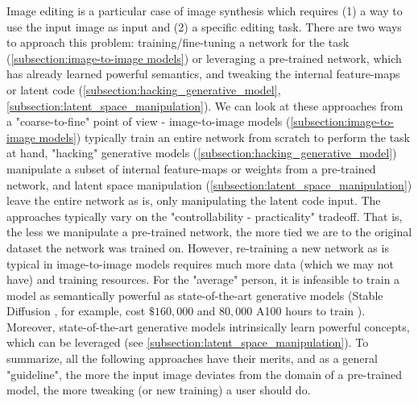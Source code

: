 Image editing is a particular case of image synthesis which requires (1) a way to use the 
input image as input and (2) a specific editing task. There are two ways to approach this 
problem: training/fine-tuning a network for the task (\ref{subsection:image-to-image models}) or 
leveraging a pre-trained network, which has already learned powerful semantics, and tweaking the 
internal feature-maps or latent code (\ref{subsection:hacking_generative_model}, \ref{subsection:latent_space_manipulation}).
We can look at these approaches from a "coarse-to-fine" point of view - image-to-image models (\ref{subsection:image-to-image models})
typically train an entire network from scratch to perform the task at hand, "hacking" generative models (\ref{subsection:hacking_generative_model})
manipulate a subset of internal feature-maps or weights from a pre-trained network, and latent space manipulation (\ref{subsection:latent_space_manipulation})
leave the entire network as is, only manipulating the latent code input. The approaches typically 
vary on the "controllability - practicality" tradeoff. That is, the less we manipulate a pre-trained 
network, the more tied we are to the original dataset the network was trained on. However, re-training 
a new network as is typical in image-to-image models requires much more data (which we may not have)
and training resources. For the "average" person, it is infeasible to train a model as semantically powerful as 
state-of-the-art generative models (Stable Diffusion \citep{rombach2022high}, for example, cost $\$160,000$ and 
$80,000$ A100 \citep{gpua100} hours to train \citep{MosaicML}). Moreover, state-of-the-art generative models 
intrinsically learn powerful concepts, which can be leveraged (see \ref{subsection:latent_space_manipulation}). 
To summarize, all the following approaches have their merits, and as a general "guideline", the more the 
input image deviates from the domain of a pre-trained model, the more tweaking (or new training) a user 
should do.

